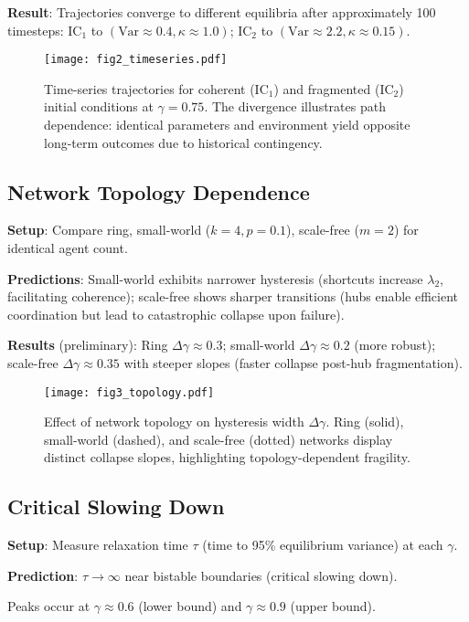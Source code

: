 \documentclass[12pt,a4paper]{article}
\begin{document}
\textbf{Result}: Trajectories converge to different equilibria after approximately 100 timesteps: IC$_1$ to $(\text{Var} \approx 0.4, \kappa \approx 1.0)$; IC$_2$ to $(\text{Var} \approx 2.2, \kappa \approx 0.15)$.

\begin{figure}[H]
\centering
\texttt{[image: fig2\_timeseries.pdf]}
\caption{Time-series trajectories for coherent (IC$_1$) and fragmented (IC$_2$) initial conditions at $\gamma=0.75$. The divergence illustrates path dependence: identical parameters and environment yield opposite long-term outcomes due to historical contingency.}
\label{fig:timeseries}
\end{figure}

\subsection{Network Topology Dependence}
\textbf{Setup}: Compare ring, small-world ($k=4, p=0.1$), scale-free ($m=2$) for identical agent count.

\textbf{Predictions}: Small-world exhibits narrower hysteresis (shortcuts increase $\lambda_2$, facilitating coherence); scale-free shows sharper transitions (hubs enable efficient coordination but lead to catastrophic collapse upon failure).

\textbf{Results} (preliminary): Ring $\Delta \gamma \approx 0.3$; small-world $\Delta \gamma \approx 0.2$ (more robust); scale-free $\Delta \gamma \approx 0.35$ with steeper slopes (faster collapse post-hub fragmentation).

\begin{figure}[H]
\centering
\texttt{[image: fig3\_topology.pdf]}
\caption{Effect of network topology on hysteresis width $\Delta \gamma$. Ring (solid), small-world (dashed), and scale-free (dotted) networks display distinct collapse slopes, highlighting topology-dependent fragility.}
\label{fig:topology}
\end{figure}

\subsection{Critical Slowing Down}
\textbf{Setup}: Measure relaxation time $\tau$ (time to 95\% equilibrium variance) at each $\gamma$.

\textbf{Prediction}: $\tau \to \infty$ near bistable boundaries (critical slowing down).

Peaks occur at $\gamma \approx 0.6$ (lower bound) and $\gamma \approx 0.9$ (upper bound).
\end{document}
